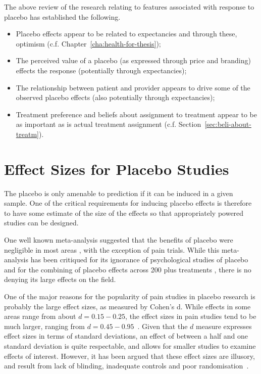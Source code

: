 The above review of the  research relating to features associated with response to placebo has established the following. 
\begin{itemize}
\item Placebo effects appear to be related to expectancies and through these, optimism (c.f. Chapter~\ref{cha:health-for-thesis});
\item The perceived value of a placebo (as expressed through price and branding) effects the response (potentially through expectancies);
\item The relationship between patient and provider appears to drive some of the observed placebo effects (also potentially through expectancies);
\item Treatment preference and beliefs about assignment to treatment appear to be as important as is actual treatment assignment (c.f. Section~\ref{sec:beli-about-treatm}).
\end{itemize}

\section{Effect Sizes for Placebo Studies}
\label{sec:effect-sizes-placebo}
The placebo is only amenable to prediction if it can be induced in a given sample. One of the critical requirements for inducing placebo effects is therefore to have some estimate of the size of the effects so that appropriately powered studies can be designed. 

One well known meta-analysis suggested that the benefits of placebo were negligible in most areas \cite{hrobjartsson2001}, with the exception of pain trials. While this meta-analysis has been critiqued for its ignorance of psychological studies of placebo \cite{Evans2003,Stewart-Williams2004b}  and for the combining of placebo effects across 200 plus treatments \cite{Wickramasekera2001}, there is no denying its large effects on the field. 

One of the major reasons for the popularity of pain studies in placebo research is probably the large effect sizes, as measured by Cohen's d. While effects in some areas range from about $d=0.15-0.25$, the effect sizes in pain studies tend to be much larger, ranging from $d=0.45-0.95$~\cite{Vase2002}. Given that the $d$ measure  expresses effect sizes in terms of standard deviations, an effect of between a half and one standard deviation is quite respectable, and allows for smaller studies to examine effects of interest.  However, it has been argued that these effect sizes are illusory, and result from lack of blinding, inadequate controls and poor randomisation~\cite{hrobjartsson2003,Kienle1997}. 



